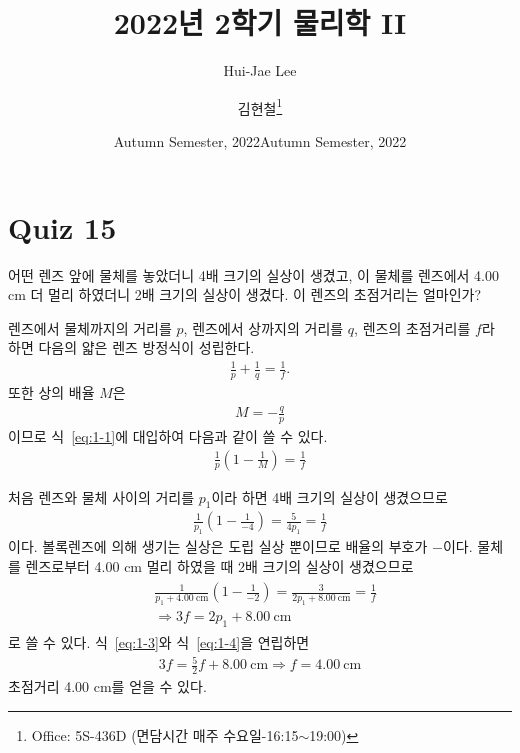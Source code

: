 \documentclass[tightenlines,floatfix,nofootinbib,superscriptaddress,fleqn]{revtex4}
\begin{document}
\title{\Large 2022년 2학기 물리학 II}
\author{Hui-Jae Lee} 
\date{Autumn Semester, 2022}
\author{김현철\footnote{Office: 5S-436D (면담시간 매주
    수요일-16:15$\sim$19:00)}} 
\date{Autumn Semester, 2022}
\maketitle


\section*{\large Quiz 15}
어떤 렌즈 앞에 물체를 놓았더니 4배 크기의 실상이 생겼고, 이 물체를
렌즈에서 4.00 cm 더 멀리 하였더니 2배 크기의 실상이 생겼다. 이 렌즈의
초점거리는 얼마인가? 

렌즈에서 물체까지의 거리를 $p$, 렌즈에서 상까지의 거리를 $q$, 렌즈의 초점거리를
$f$라 하면 다음의 얇은 렌즈 방정식이 성립한다.
\begin{align}\label{eq:1-1}
  \frac{1}{p}+\frac{1}{q}=\frac{1}{f}.
\end{align}
또한 상의 배율 $M$은
\begin{align}
  M = -\frac{q}{p}
\end{align}
이므로 식~\eqref{eq:1-1}에 대입하여 다음과 같이 쓸 수 있다.
\begin{align}
  \frac{1}{p}\left(1-\frac{1}{M}\right)=\frac{1}{f}
\end{align}

처음 렌즈와 물체 사이의 거리를 $p_1$이라 하면 4배 크기의 실상이 생겼으므로
\begin{align}\label{eq:1-3}
  \frac{1}{p_1}\left(1-\frac{1}{-4}\right)
  =\frac{5}{4p_1}=\frac{1}{f}
\end{align}
이다. 볼록렌즈에 의해 생기는 실상은 도립 실상 뿐이므로 배율의 부호가 $-$이다. 
물체를 렌즈로부터 4.00 cm 멀리 하였을 때 2배 크기의 실상이 생겼으므로
\begin{align}\label{eq:1-4}
  \begin{split}
    &\frac{1}{p_1+4.00~\mathrm{cm}}\left(1-\frac{1}{-2}\right)
    =\frac{3}{2p_1+8.00~\mathrm{cm}}=\frac{1}{f} \\
    &\Longrightarrow 3f= 2p_1+8.00~\mathrm{cm}
  \end{split}
\end{align}
로 쓸 수 있다. 식~\eqref{eq:1-3}와 식~\eqref{eq:1-4}을 연립하면
\begin{align}
  3f= \frac{5}{2}f+8.00~\mathrm{cm}
  \Longrightarrow
  f= 4.00~\mathrm{cm}
\end{align}
초점거리 4.00 cm를 얻을 수 있다.
\vspace{1cm}
\end{document}
